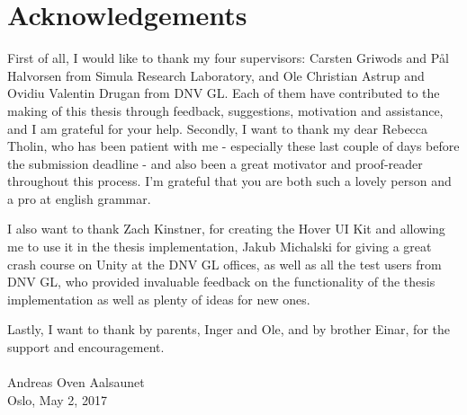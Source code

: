 % 

\chapter*{Acknowledgements}  
First of all, I would like to thank my four supervisors: Carsten Griwods and Pål Halvorsen from Simula Research Laboratory, and Ole Christian Astrup and Ovidiu Valentin Drugan 
from DNV GL. Each of them have contributed to the making of this thesis through feedback, suggestions, motivation and assistance, and I am grateful for your help.
Secondly, I want to thank my dear Rebecca Tholin, who has been patient with me - especially these last couple of days before the submission deadline - and also
been a great motivator and proof-reader throughout this process. I'm grateful that you are both such a lovely person and a pro at english grammar.

I also want to thank Zach Kinstner, for creating the Hover UI Kit and allowing me to use it in the thesis implementation,  
Jakub Michalski for giving a great crash course on Unity at the DNV GL offices, as well as all the test users from DNV GL, 
who provided invaluable feedback on the functionality of the thesis implementation as well as plenty of ideas for new ones.

Lastly, I want to thank by parents, Inger and Ole, and by brother Einar, for the support and encouragement. \\\\


\noindent
Andreas Oven Aalsaunet \\
Oslo, May 2, 2017






